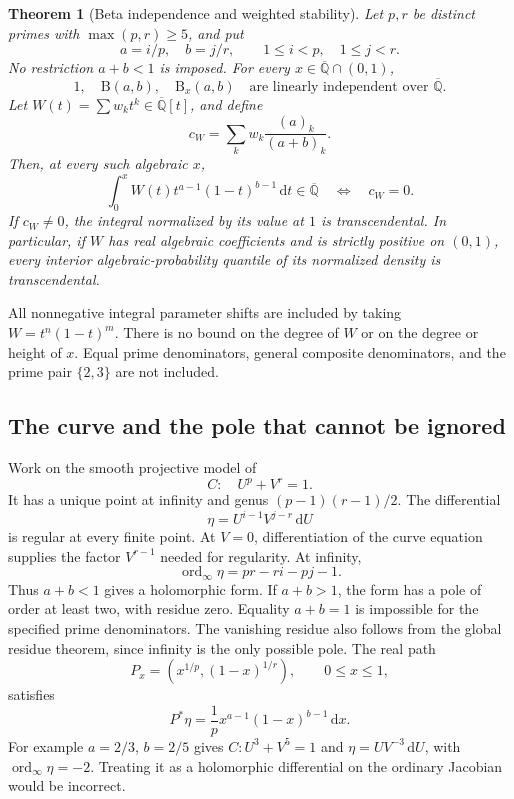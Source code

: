 \documentclass[11pt,a4paper]{article}
\numberwithin{equation}{section}
\newtheorem{theorem}{Theorem}[section]
\theoremstyle{definition}
\theoremstyle{remark}
\newcommand{\Qb}{\overline{\mathbb Q}}
\newcommand{\B}{\mathrm B}
\newcommand{\ord}{\operatorname{ord}}
\newcommand{\dd}{\,\mathrm d}
\begin{document}
\begin{theorem}[Beta independence and weighted stability]\label{thm:fermat-beta}
Let $p,r$ be distinct primes with $\max(p,r)\ge5$, and put
\[
 a=i/p,\quad b=j/r,\qquad 1\le i<p,\quad1\le j<r.
\]
No restriction $a+b<1$ is imposed. For every $x\in\Qb\cap(0,1)$,
\begin{equation}\label{eq:beta-three-independent}
 1,\quad \B(a,b),\quad \B_x(a,b)
 \quad\text{are linearly independent over }\Qb.
\end{equation}
Let $W(t)=\sum w_kt^k\in\Qb[t]$, and define
\begin{equation}\label{eq:weight-coefficient}
 c_W=\sum_k w_k\frac{(a)_k}{(a+b)_k}.
\end{equation}
Then, at every such algebraic $x$,
\begin{equation}\label{eq:weight-algebraic-iff}
 \int_0^xW(t)t^{a-1}(1-t)^{b-1}\dd t\in\Qb
 \quad\Longleftrightarrow\quad c_W=0.
\end{equation}
If $c_W\ne0$, the integral normalized by its value at $1$ is
transcendental. In particular, if $W$ has real algebraic coefficients and
is strictly positive on $(0,1)$, every interior algebraic-probability
quantile of its normalized density is transcendental.
\end{theorem}
All nonnegative integral parameter shifts are included by taking
$W=t^n(1-t)^m$. There is no bound on the degree of $W$ or on the degree or
height of $x$. Equal prime denominators, general composite denominators,
and the prime pair $\{2,3\}$ are not included.

\subsection{The curve and the pole that cannot be ignored}
Work on the smooth projective model of
\begin{equation}
 C:\quad U^p+V^r=1.
\end{equation}
It has a unique point at infinity and genus $(p-1)(r-1)/2$. The differential
\begin{equation}\label{eq:fermat-differential}
 \eta=U^{i-1}V^{j-r}\dd U
\end{equation}
is regular at every finite point. At $V=0$, differentiation of the curve
equation supplies the factor $V^{r-1}$ needed for regularity. At infinity,
\begin{equation}\label{eq:fermat-order}
 \ord_\infty\eta=pr-ri-pj-1.
\end{equation}
Thus $a+b<1$ gives a holomorphic form. If $a+b>1$, the form has a pole of
order at least two, with residue zero. Equality $a+b=1$ is impossible for
the specified prime denominators. The vanishing residue also follows
from the global residue theorem, since infinity is the only possible
pole. The real path
\[
 P_x=(x^{1/p},(1-x)^{1/r}),\qquad 0\le x\le1,
\]
satisfies
\begin{equation}\label{eq:fermat-pullback}
 P^*\eta=\frac1p x^{a-1}(1-x)^{b-1}\dd x.
\end{equation}
For example $a=2/3$, $b=2/5$ gives $C:U^3+V^5=1$ and
$\eta=UV^{-3}\dd U$, with $\ord_\infty\eta=-2$. Treating it as a
holomorphic differential on the ordinary Jacobian would be incorrect.
\end{document}
